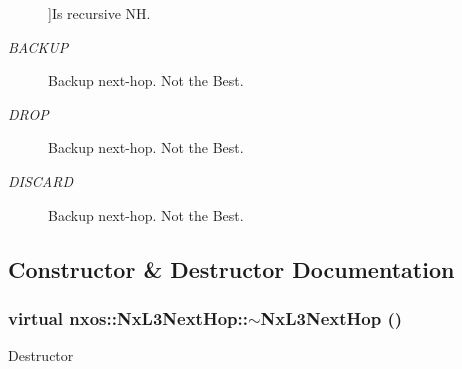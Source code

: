 \begin{Desc}
\begin{description}
{}]Is recursive NH. \item[{\em 
\hypertarget{classnxos_1_1NxL3NextHop_ab58475e35a53b76cb9bdbfde04d537f3ae078b4acb489b4d29214764fe732bd5e}{
BACKUP}
\label{classnxos_1_1NxL3NextHop_ab58475e35a53b76cb9bdbfde04d537f3ae078b4acb489b4d29214764fe732bd5e}
}]Backup next-\/hop. Not the Best. \item[{\em 
\hypertarget{classnxos_1_1NxL3NextHop_ab58475e35a53b76cb9bdbfde04d537f3af0d20d4eed57271845ddcb39a2451ce5}{
DROP}
\label{classnxos_1_1NxL3NextHop_ab58475e35a53b76cb9bdbfde04d537f3af0d20d4eed57271845ddcb39a2451ce5}
}]Backup next-\/hop. Not the Best. \item[{\em 
\hypertarget{classnxos_1_1NxL3NextHop_ab58475e35a53b76cb9bdbfde04d537f3a71e4b55f7ef95579440ef91cc247c2c7}{
DISCARD}
\label{classnxos_1_1NxL3NextHop_ab58475e35a53b76cb9bdbfde04d537f3a71e4b55f7ef95579440ef91cc247c2c7}
}]Backup next-\/hop. Not the Best. \end{description}
\end{Desc}



\subsection{Constructor \& Destructor Documentation}
\hypertarget{classnxos_1_1NxL3NextHop_a98362517a1a558bc9ecf457452273afb}{
\subsubsection[{$\sim$NxL3NextHop}]{\setlength{\rightskip}{0pt plus 5cm}virtual nxos::NxL3NextHop::$\sim$NxL3NextHop ()}}
\label{classnxos_1_1NxL3NextHop_a98362517a1a558bc9ecf457452273afb}
Destructor 

